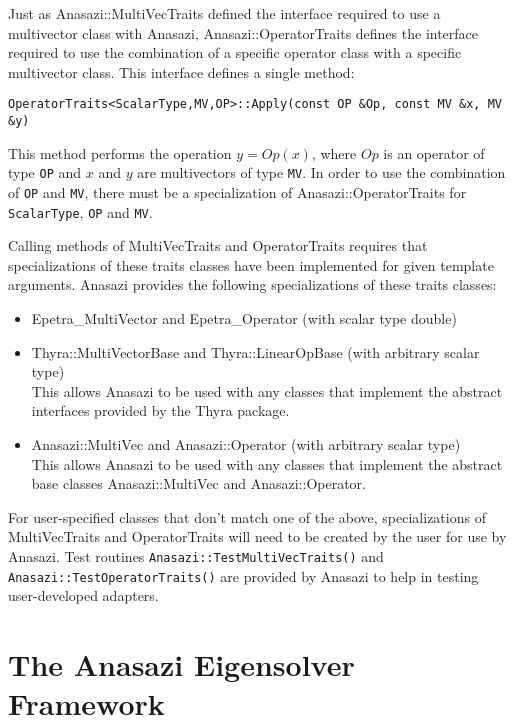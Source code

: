 Just as Anasazi::MultiVecTraits defined the interface required to use a
multivector class with Anasazi, Anasazi::OperatorTraits defines the
interface required to use the combination of a specific operator class with a
specific multivector class. This interface defines a single method:
\begin{verbatim}
OperatorTraits<ScalarType,MV,OP>::Apply(const OP &Op, const MV &x, MV &y)
\end{verbatim}
This method performs the operation $y = Op(x)$, where $Op$ is an operator of type
\verb!OP! and $x$ and $y$ are multivectors of type \verb!MV!. In order to use the
combination of \verb!OP! and \verb!MV!, there must be a specialization of
Anasazi::OperatorTraits for \verb!ScalarType!, \verb!OP! and \verb!MV!. 

Calling methods of MultiVecTraits and OperatorTraits requires that specializations of
these traits classes have been implemented for given template arguments.  
Anasazi provides the following specializations of these traits classes:
\begin{itemize}
  \item Epetra\_MultiVector and Epetra\_Operator (with scalar type double)    
  \item Thyra::MultiVectorBase and Thyra::LinearOpBase (with arbitrary scalar type) \\
        This allows Anasazi to be used with any classes that implement the abstract interfaces provided by the Thyra package.    
  \item Anasazi::MultiVec and Anasazi::Operator (with arbitrary scalar type) \\
        This allows Anasazi to be used with any classes that implement the abstract base
        classes Anasazi::MultiVec and Anasazi::Operator.
\end{itemize}

For user-specified classes that don't match one of the above, specializations of
MultiVecTraits and OperatorTraits will need to be created by the user for use by Anasazi.
Test routines \verb!Anasazi::TestMultiVecTraits()! and
\verb!Anasazi::TestOperatorTraits()! are provided by Anasazi to help in testing
user-developed adapters.


\section{The Anasazi Eigensolver Framework}
\label{sec:anasazi:solver_framework}

